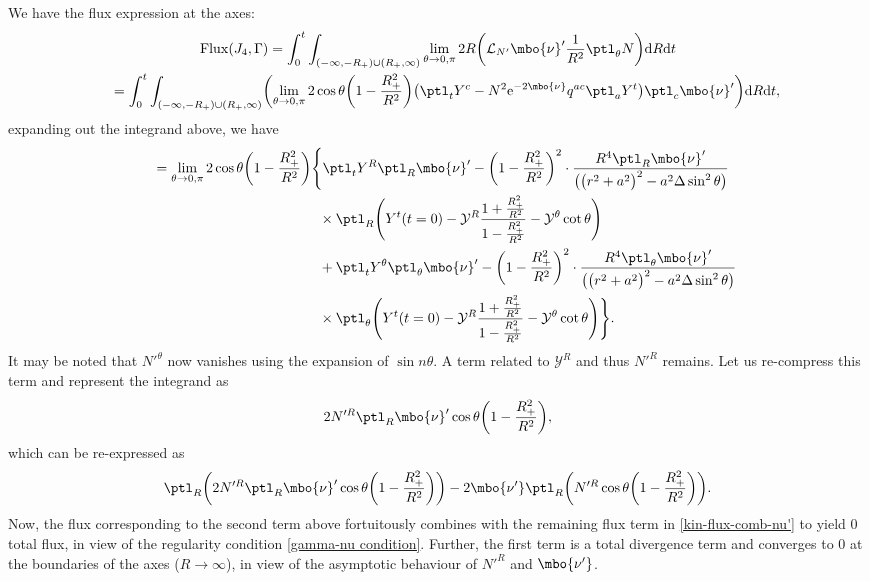 We have the flux expression at the axes:
\begin{gather*}
{\rm Flux} (J_4, \Gamma) = \int^t_0 \int_{ (-\infty,-R_
	+) \cup (R_+, \infty)} \lim_{\theta \to 0, \pi} 2 R \biggl(\mathcal{L}_{N'} \mbo{\nu}' \frac{1}{R^2} \ptl_\theta N \biggr) {\rm d}R {\rm d}t
\notag\\
\quad{}= \int^t_0 \int_{ (-\infty,-R_
	+) \cup (R_+, \infty)}\biggl(\lim_{\theta \to 0, \pi} 2 \cos \theta \biggl(1 - \frac{R^2_+}{R^2} \biggr) \bigl(\ptl_t Y^c - N^2 {\rm e}^{-2 \mbo{\nu}} q^{ac} \ptl_a Y^t \bigr) \ptl_c \mbo{\nu}' \biggr) {\rm d}R {\rm d}t,
\end{gather*}
expanding out the integrand above, we have
\begin{align*}
\quad&{} = \lim_{\theta \to 0, \pi} 2 \cos \theta \biggl(1 - \frac{R^2_+}{R^2} \biggr)
\Biggl\{ \ptl_t Y^R \ptl_R \mbo{\nu}' - \biggl (1- \frac{R^2_+}{R^2} \biggr)^2 \cdot \frac{R^4 \ptl_R \mbo{\nu}'}{ \bigl(\bigl(r^2+a^2\bigr)^2 -a^2 \Delta
	\sin^2 \theta \bigr)} \notag\\
&\hphantom{ = \lim_{\theta \to 0, \pi} 2 \cos \theta \biggl(1 - \frac{R^2_+}{R^2} \biggr)\Biggl\{}{}
\times \ptl_R \Biggl(Y^t (t=0) - \mathcal{Y}^R \frac{1 + \frac{R^2_+}{R^2}} {{1-\frac{R^2_+}{R^2}} } - \mathcal{Y}^ \theta \cot \theta \Biggr) \notag\\
&\hphantom{ = \lim_{\theta \to 0, \pi} 2 \cos \theta \biggl(1 - \frac{R^2_+}{R^2} \biggr)\Biggl\{}{}
+ \ptl_t Y^\theta \ptl_\theta \mbo{\nu}' - \biggl(1 - \frac{R^2_+}{R^2} \biggr)^2 \cdot \frac{R^4 \ptl_\theta \mbo{\nu}'}{ \bigl(\bigl(r^2+a^2\bigr)^2 -a^2 \Delta \sin^2 \theta\bigr)} \notag\\
&\hphantom{ = \lim_{\theta \to 0, \pi} 2 \cos \theta \biggl(1 - \frac{R^2_+}{R^2} \biggr)\Biggl\{}{}
\times \ptl_\theta \Biggl(Y^t(t=0) - \mathcal{Y}^R \frac{1+ \frac{R^2_+}{R^2}}{1-\frac{R^2_+}{R^2}} - \mathcal{Y}^\theta \cot \theta \Biggr) \Biggr\}.
\end{align*}
It may be noted that $N'^\theta$ now vanishes using the expansion of $\sin n \theta $.
A term related to $\mathcal{Y}^R$ and thus $N'^R$ remains. Let us re-compress this term and represent the integrand as
\[
2N'^R \ptl_R \mbo{\nu}' \cos \theta\biggl(1- \frac{R^2_+}{R^2}\biggr),
\]
which can be re-expressed as
\[
\ptl_R \biggl(2 N'^R \ptl_R \mbo{\nu}' \cos \theta \biggl(1- \frac{R^2_+}{R^2} \biggr) \biggr) - 2 \mbo{\nu'}\ptl_R \biggl(N'^R \cos \theta \biggl(1-\frac{R^2_+}{R^2} \biggr) \biggr).
\]
Now, the flux corresponding to the second term above fortuitously combines with the remaining flux term in \eqref{kin-flux-comb-nu'} to yield $0$ total flux, in view of the regularity condition \eqref{gamma-nu condition}. Further, the first term is a total divergence term and converges to $0$ at the boundaries of the axes ($R \to \infty$), in view of the asymptotic behaviour of $N'^R$ and $\mbo{\nu'}$.


